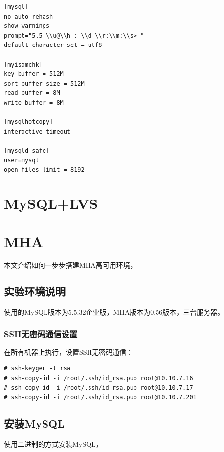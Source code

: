 \begin{verbatim}
[mysql]
no-auto-rehash
show-warnings
prompt="5.5 \\u@\\h : \\d \\r:\\m:\\s> "
default-character-set = utf8

[myisamchk]
key_buffer = 512M
sort_buffer_size = 512M
read_buffer = 8M
write_buffer = 8M

[mysqlhotcopy]
interactive-timeout

[mysqld_safe]
user=mysql
open-files-limit = 8192
\end{verbatim}

\chapter{MySQL+LVS}

\chapter{MHA}
\label{chap:mha}

本文介绍如何一步步搭建MHA高可用环境，

\section{实验环境说明}
\label{sec:MHAEnvSpecific}

使用的MySQL版本为5.5.32企业版，MHA版本为0.56版本，三台服务器。

\subsection{SSH无密码通信设置}
\label{sec:SSHSetup}

在所有机器上执行，设置SSH无密码通信：

\begin{verbatim}
# ssh-keygen -t rsa
# ssh-copy-id -i /root/.ssh/id_rsa.pub root@10.10.7.16
# ssh-copy-id -i /root/.ssh/id_rsa.pub root@10.10.7.17
# ssh-copy-id -i /root/.ssh/id_rsa.pub root@10.10.7.201
\end{verbatim}

\section{安装MySQL}
\label{InstallMySQL}

使用二进制的方式安装MySQL，

